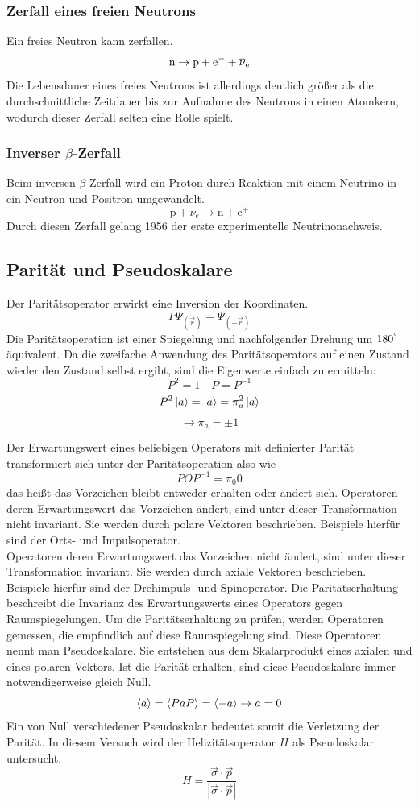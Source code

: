 \subsubsection{Zerfall eines freien Neutrons}
Ein freies Neutron kann zerfallen. 
$${\hbox{n}}\to {\hbox{p}}+{\hbox{e}}^{-}+\overline {\nu }_{{{\mathrm {e}}}}$$
Die Lebensdauer eines freies Neutrons ist allerdings deutlich größer als die durchschnittliche Zeitdauer bis zur Aufnahme des Neutrons in einen Atomkern, wodurch dieser Zerfall selten eine Rolle spielt.
\subsubsection{Inverser $\beta$-Zerfall}
Beim inversen $\beta$-Zerfall wird ein Proton durch Reaktion mit einem Neutrino in ein Neutron und Positron umgewandelt.
$${\displaystyle \mathrm {p} +{\overline {\nu }}_{e}\to \mathrm {n} +\mathrm {e} ^{+}}$$
Durch diesen Zerfall gelang 1956 der erste experimentelle Neutrinonachweis.

\subsection{Parität und Pseudoskalare}

Der Paritätsoperator erwirkt eine Inversion der Koordinaten. 
$$P\Psi_{(\vec{r})} = \Psi_{(-\vec{r})}$$
Die Paritätsoperation ist einer Spiegelung und nachfolgender Drehung um $180^\degree$ äquivalent.
Da die zweifache Anwendung des Paritätsoperators auf einen Zustand wieder den Zustand selbst ergibt, sind die Eigenwerte einfach zu ermitteln:
$$P^2 = 1 \quad P = P^{-1} $$
$$P^2\ket{a} = \ket{a} = \pi_a^2\ket{a}$$
$$\rightarrow \pi_a = \pm 1$$

Der Erwartungswert eines beliebigen Operators mit definierter Parität transformiert sich unter der Paritätsoperation also wie
$$POP^{-1} = \pi_0 0$$
das heißt das Vorzeichen bleibt entweder erhalten oder ändert sich. 
Operatoren deren Erwartungswert das Vorzeichen ändert, sind unter dieser Transformation nicht invariant. Sie werden durch polare Vektoren beschrieben. Beispiele hierfür sind der Orts- und Impulsoperator.\\
Operatoren deren Erwartungswert das Vorzeichen nicht ändert, sind unter dieser Transformation invariant. Sie werden durch axiale Vektoren beschrieben. Beispiele hierfür sind der Drehimpuls- und Spinoperator. 
Die Paritätserhaltung beschreibt die Invarianz des Erwartungswerts eines Operators gegen Raumspiegelungen. Um die Paritätserhaltung zu prüfen, werden Operatoren gemessen, die empfindlich auf diese Raumspiegelung sind. Diese Operatoren nennt man Pseudoskalare. Sie entstehen aus dem Skalarprodukt eines axialen und eines polaren Vektors. Ist die Parität erhalten, sind diese Pseudoskalare immer notwendigerweise gleich Null. 
$$\braket{a} = \braket{PaP} = \braket{-a} \rightarrow a = 0$$
Ein von Null verschiedener Pseudoskalar bedeutet somit die Verletzung der Parität.
In diesem Versuch wird der Helizitätsoperator $H$ als Pseudoskalar untersucht. 
$$ H = \frac{\vec{\sigma}\cdot\vec{p}}{\left\vert\vec{\sigma}\cdot\vec{p}\right\vert}$$


